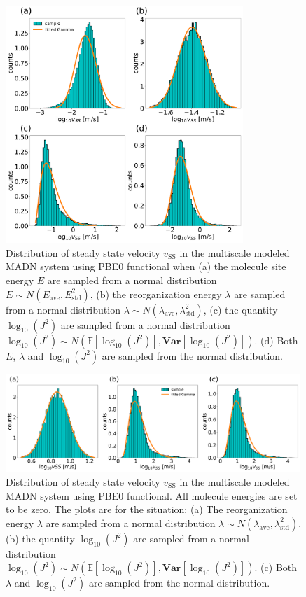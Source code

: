 \documentclass[letterpaper,12pt]{article}
\begin{document}
\begin{figure}[H]
    \centering
    \includegraphics[width=0.8\textwidth]{figs/MADN_HFX/fig_mle_MADN_withE_SS.pdf}
    \caption{Distribution of steady state velocity $v_\text{SS}$ in the multiscale modeled MADN system using PBE0 functional when (a) the molecule site energy $E$ are sampled from a normal distribution $E \sim N(E_\text{ave},E^2_\text{std})$, (b) the reorganization energy $\lambda$ are sampled from a normal distribution $\lambda \sim N(\lambda_\text{ave},\lambda^2_\text{std})$, (c) the quantity $\log_{10}(J^2)$ are sampled from a normal distribution $\log_{10}(J^2) \sim N(\mathbb{E}[\log_{10}(J^2)], \textbf{Var}[\log_{10}(J^2)] )$. (d) Both $E$, $\lambda$ and $\log_{10}(J^2)$ are sampled from the normal distribution. }
    \label{fig:mle_MADN_withE_SS}
\end{figure}

\begin{figure}[H]
    \centering
    \includegraphics[width=0.99\textwidth]{figs/MADN_HFX/fig_mle_MADN_noE_SS.pdf}
    \caption{Distribution of steady state velocity $v_\text{SS}$ in the multiscale modeled MADN system using PBE0 functional. All molecule energies are set to be zero.  
    The plots are for the situation: (a) The reorganization energy $\lambda$ are sampled from a normal distribution $\lambda \sim N(\lambda_\text{ave},\lambda^2_\text{std})$. (b) the quantity $\log_{10}(J^2)$ are sampled from a normal distribution $\log_{10}(J^2) \sim N(\mathbb{E}[\log_{10}(J^2)], \textbf{Var}[\log_{10}(J^2)] )$. (c) Both $\lambda$ and $\log_{10}(J^2)$ are sampled from the normal distribution. }
    \label{fig:mle_MADN_noE_SS}
\end{figure}
 
\end{document}
